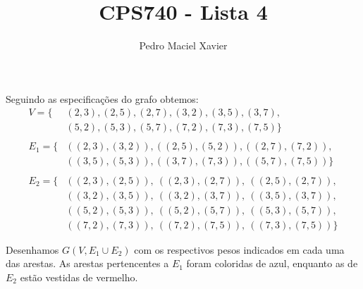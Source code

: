 \documentclass{homework}
\title{CPS740 - Lista 4}
\author{Pedro Maciel Xavier}
\begin{document}
	
	\maketitle
	
	\quest %
	
	Seguindo as especificações do grafo obtemos:
	\begin{align*}
		V = \{&(2, 3), (2, 5), (2, 7), (3, 2), (3, 5), (3, 7),\\
		&(5, 2), (5, 3), (5, 7), (7, 2), (7, 3), (7, 5)\}\\
		~\\
		E_1 = \{&((2, 3), (3, 2)), ((2, 5), (5, 2)), ((2, 7), (7, 2)),\\
		&((3, 5), (5, 3)), ((3, 7), (7, 3)), ((5, 7), (7, 5))\}\\
		~\\
		E_2 = \{&((2, 3), (2, 5)),~ ((2, 3), (2, 7)),~ ((2, 5), (2, 7)),\\
		&((3, 2), (3, 5)),~ ((3, 2), (3, 7)),~ ((3, 5), (3, 7)),\\
		&((5, 2), (5, 3)),~ ((5, 2), (5, 7)),~ ((5, 3), (5, 7)),\\
		&((7, 2), (7, 3)),~ ((7, 2), (7, 5)),~ ((7, 3), (7, 5))\}
	\end{align*}
	
	\subsubquest Desenhamos $G(V, E_1 \cup E_2)$ com os respectivos pesos indicados em cada uma das arestas. As arestas pertencentes a $E_1$ foram coloridas de {\color{blue!40}azul}, enquanto as de $E_2$ estão vestidas de {\color{red!40}vermelho}.
	
	\begin{fig}
			
	\end{fig}

	\pagebreak
	
	
\end{document}
